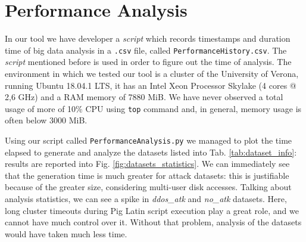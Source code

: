 \section{Performance Analysis}
In our tool we have developer a \textit{script} which records timestamps and duration time of big data analysis in a \texttt{.csv} file, called \texttt{PerformanceHistory.csv}. The \textit{script} mentioned before is used in order to figure out the time of analysis. 
The environment in which we tested our tool is a cluster of the University of Verona, running Ubuntu 18.04.1 LTS, it has an Intel Xeon Processor Skylake (4 cores @ 2,6 GHz) and a RAM memory of 7880 MiB. We have never observed a total usage of more of 10\% CPU using \texttt{top} command and, in general, memory usage is often below 3000 MiB.

Using our script called \texttt{PerformanceAnalysis.py} we managed to plot the time elapsed to generate and analyze the datasets listed into Tab. \ref{tab:dataset_info}: results are reported into Fig. \ref{fig:datasets_statistics}.
We can immediately see that the generation time is much greater for attack datasets: this is justifiable because of the greater size, considering multi-user disk accesses.
Talking about analysis statistics, we can see a spike in \textit{ddos\_atk} and \textit{no\_atk} datasets. Here, long cluster timeouts during Pig Latin script execution play a great role, and we cannot have much control over it. Without that problem, analysis of the datasets would have taken much less time.

